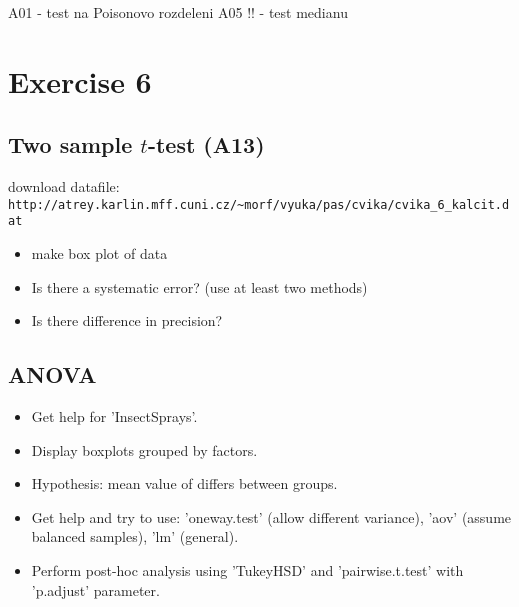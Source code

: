 \documentclass[4pt]{article}
\def\answer#1{}
\begin{document}
A01 - test na Poisonovo rozdeleni
A05 !! - test medianu

\pagebreak

\noindent
\pagebreak


\section{Exercise 6}

\subsection{Two sample $t$-test (A13)}
download datafile: \verb'http://atrey.karlin.mff.cuni.cz/~morf/vyuka/pas/cvika/cvika_6_kalcit.dat'

\begin{itemize}
 \item make box plot of data
 \item Is there a systematic error?  (use at least two methods)
 \item Is there difference in precision?
\end{itemize}



\subsection{ANOVA}
\begin{itemize}
 \item Get help for 'InsectSprays'.
 \item Display boxplots grouped by factors.
 \item Hypothesis: mean value of differs between groups.
 \item Get help and try to use: 'oneway.test' (allow different variance), 'aov' (assume balanced samples), 'lm' (general).
 
       
 \item Perform post-hoc analysis using 'TukeyHSD' and 'pairwise.t.test' with 'p.adjust' parameter.
\end{itemize}
\end{document}
